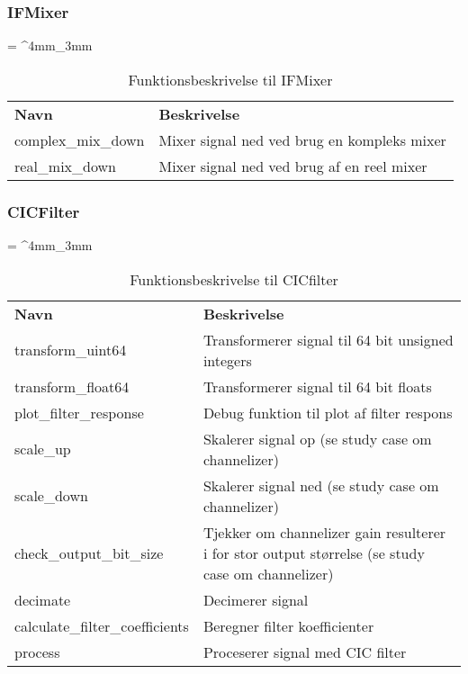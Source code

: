 \begin{appendices}
\subsubsection{IFMixer}
\begin{table}[H]
	\renewcommand{\arraystretch}{2}
	\centering
	\sffamily
	\tabulinesep = ^4mm_3mm
	\begin{tabu}{ m{4cm}  m{8.5cm} }
		\color{white}\bfseries Navn &\color{white}\bfseries Beskrivelse \\
		complex\_mix\_down & Mixer signal ned ved brug en kompleks mixer \\
		real\_mix\_down & Mixer signal ned ved brug af en reel mixer \\
	\end{tabu}
	\caption{Funktionsbeskrivelse til IFMixer}
	\label{tab:func_descr_IFMixer}
\end{table}

\subsubsection{CICFilter}
\begin{table}[H]
	\renewcommand{\arraystretch}{2}
	\centering
	\sffamily
	\tabulinesep = ^4mm_3mm
	\begin{tabu}{ m{4cm}  m{8.5cm} }
		\color{white}\bfseries Navn &\color{white}\bfseries Beskrivelse \\
		transform\_uint64 & Transformerer signal til 64 bit unsigned integers \\
		transform\_float64 & Transformerer signal til 64 bit floats \\
		plot\_filter\_response & Debug funktion til plot af filter respons \\
		scale\_up & Skalerer signal op (se study case om channelizer) \\
		scale\_down & Skalerer signal ned (se study case om channelizer) \\
		check\_output\_bit\_size & Tjekker om channelizer gain resulterer i for stor output størrelse (se study case om channelizer) \\
		decimate & Decimerer signal \\
		calculate\_filter\_coefficients & Beregner filter koefficienter \\
		process & Proceserer signal med CIC filter \\
	\end{tabu}
	\caption{Funktionsbeskrivelse til CICfilter}
	\label{tab:func_descr_CICfilter}
\end{table}
\pagebreak 


\end{appendices}
